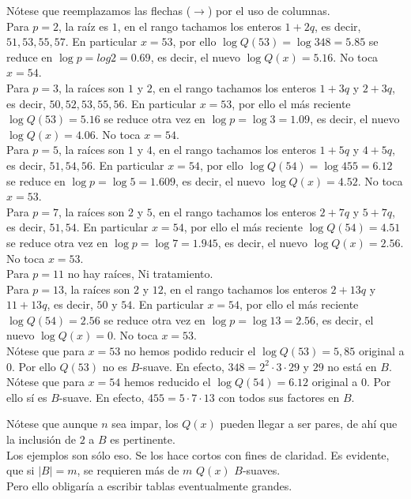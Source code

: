 \begin{ejemplo}
Nótese que reemplazamos las flechas ($\rightarrow$) por el uso de columnas. \\
Para $p=2$, la raíz es $1$, en el rango tachamos los enteros $1+2q$, es decir, $51, 53, 55, 57$. En particular $x=53$, por ello $\log {Q(53)} = \log {348} = 5.85$ se reduce en $\log p = log 2 = 0.69$, es decir, el nuevo $\log Q(x)= 5.16$. No toca $x=54$. \\
Para $p=3$, la raíces son $1$ y $2$, en el rango tachamos los enteros $1+3q$ y $2+3q$, es decir, $50, 52, 53, 55, 56$. En particular $x=53$, por ello el más reciente $\log {Q(53)} = 5.16$ se reduce otra vez en $\log p = \log 3 = 1.09$, es decir, el nuevo $\log Q(x)= 4.06$. No toca $x=54$. \\
Para $p=5$, la raíces son $1$ y $4$, en el rango tachamos los enteros $1+5q$ y $4+5q$, es decir, $51, 54, 56$. En particular $x=54$, por ello $\log {Q(54)} = \log {455} = 6.12$ se reduce en $\log p = \log 5 = 1.609$, es decir, el nuevo $\log Q(x)= 4.52$. No toca $x=53$. \\
Para $p=7$, la raíces son $2$ y $5$, en el rango tachamos los enteros $2+7q$ y $5+7q$, es decir, $51, 54$. En particular $x=54$, por ello el más reciente $\log {Q(54)} = 4.51$ se reduce otra vez en $\log p = \log 7 = 1.945$, es decir, el nuevo $\log Q(x)= 2.56$. No toca $x=53$. \\
Para $p=11$ no hay raíces, Ni tratamiento. \\
Para $p=13$, la raíces son $2$ y $12$, en el rango tachamos los enteros $2+13q$ y $11+13q$, es decir, $50$ y $54$. En particular $x=54$, por ello el más reciente $\log {Q(54)} = 2.56$ se reduce otra vez en $\log p = \log 13 = 2.56$, es decir, el nuevo $\log Q(x)= 0$. No toca $x=53$. \\
Nótese que para $x=53$ no hemos podido reducir el $\log Q(53)=5,85$ original a $0$. Por ello $Q(53)$ no es $B$-suave. En efecto, $348=2^2 \cdot 3 \cdot 29$ y $29$ no está en $B$. \\
Nótese que para $x=54$ hemos reducido el $\log Q(54)=6.12$ original a $0$. Por ello sí es $B$-suave. En efecto, $455=5 \cdot 7 \cdot 13$ con todos sus factores en $B$. \\
\end{ejemplo}

Nótese que aunque $n$ sea impar, los $Q(x)$ pueden llegar a ser pares, de ahí que la inclusión de $2$ a $B$ es pertinente. \\

Los ejemplos son sólo eso. Se los hace cortos con fines de claridad. Es evidente, que si $|B|=m$, se requieren más de $m$ $Q(x)$ $B$-suaves.\\
Pero ello obligaría a escribir tablas eventualmente grandes. \\

